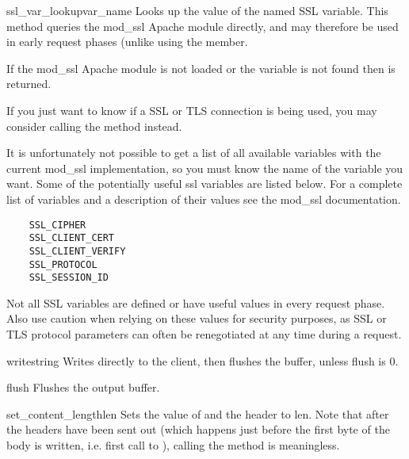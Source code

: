 \begin{methoddesc}[request]{ssl_var_lookup}{var_name}
  Looks up the value of the named SSL variable.  This method queries
  the mod_ssl Apache module directly, and may therefore be used in
  early request phases (unlike using the  member.

  If the mod_ssl Apache module is not loaded or the variable is not
  found then  is returned.

  If you just want to know if a SSL or TLS connection is being used,
  you may consider calling the  method instead.

  It is unfortunately not possible to get a list of all available
  variables with the current mod_ssl implementation, so you must know
  the name of the variable you want.  Some of the potentially useful
  ssl variables are listed below.  For a complete list of variables
  and a description of their values see the mod_ssl documentation.

  \begin{verbatim}
    SSL_CIPHER
    SSL_CLIENT_CERT
    SSL_CLIENT_VERIFY
    SSL_PROTOCOL
    SSL_SESSION_ID
  \end{verbatim}

  \begin{notice}
  Not all SSL variables are defined or have useful values in every
  request phase.  Also use caution when relying on these values for
  security purposes, as SSL or TLS protocol parameters can often be
  renegotiated at any time during a request.
  \end{notice}

\end{methoddesc}

\begin{methoddesc}[request]{write}{string}
  Writes  directly to the client, then flushes the buffer,
  unless flush is 0.
\end{methoddesc}

\begin{methoddesc}[request]{flush}{}
  Flushes the output buffer.
\end{methoddesc}

\begin{methoddesc}[request]{set_content_length}{len}
  Sets the value of  and the 
  header to len. Note that after the headers have been sent out (which
  happens just before the first byte of the body is written,
  i.e. first call to ), calling the method is
  meaningless.
\end{methoddesc}


